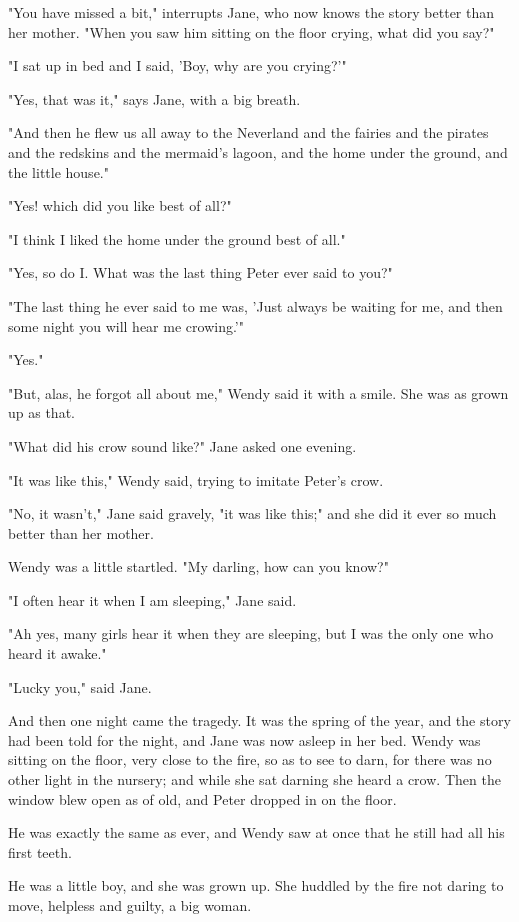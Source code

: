 "You have missed a bit," interrupts Jane, who now knows the story better
than her mother. "When you saw him sitting on the floor crying, what did
you say?"


"I sat up in bed and I said, 'Boy, why are you crying?'"


"Yes, that was it," says Jane, with a big breath.


"And then he flew us all away to the Neverland and the fairies and the
pirates and the redskins and the mermaid's lagoon, and the home under the
ground, and the little house."


"Yes! which did you like best of all?"


"I think I liked the home under the ground best of all."


"Yes, so do I. What was the last thing Peter ever said to you?"


"The last thing he ever said to me was, 'Just always be waiting for me,
and then some night you will hear me crowing.'"


"Yes."


"But, alas, he forgot all about me," Wendy said it with a smile. She was
as grown up as that.


"What did his crow sound like?" Jane asked one evening.


"It was like this," Wendy said, trying to imitate Peter's crow.


"No, it wasn't," Jane said gravely, "it was like this;" and she did it
ever so much better than her mother.


Wendy was a little startled. "My darling, how can you know?"


"I often hear it when I am sleeping," Jane said.


"Ah yes, many girls hear it when they are sleeping, but I was the only one
who heard it awake."


"Lucky you," said Jane.


And then one night came the tragedy. It was the spring of the year, and
the story had been told for the night, and Jane was now asleep in her bed.
Wendy was sitting on the floor, very close to the fire, so as to see to
darn, for there was no other light in the nursery; and while she sat
darning she heard a crow. Then the window blew open as of old, and Peter
dropped in on the floor.


He was exactly the same as ever, and Wendy saw at once that he still had
all his first teeth.


He was a little boy, and she was grown up. She huddled by the fire not
daring to move, helpless and guilty, a big woman.


